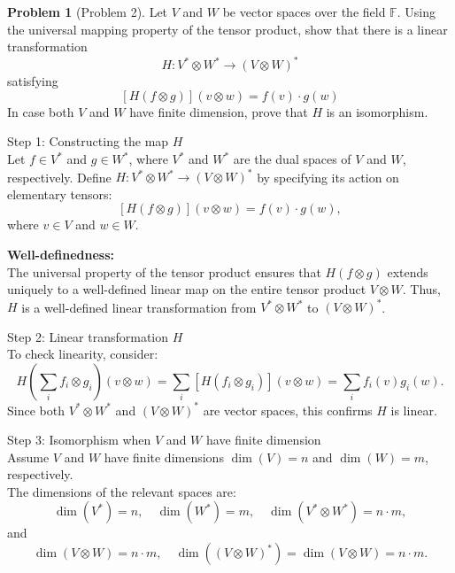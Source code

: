 \documentclass[12pt]{article}
\theoremstyle{definition}
\newtheorem{problem}{Problem}
\begin{document}
\begin{problem}[Problem 2]
    Let $V$ and $W$ be vector spaces over the field $\mathbb{F}$. Using the universal
    mapping property of the tensor product, show that there is a linear transformation
    \[
        H: V^* \otimes W^* \longrightarrow (V \otimes W)^*
    \]
    satisfying
    \[
        [H(f \otimes g)](v \otimes w) = f(v) \cdot g(w)
    \]
    In case both $V$ and $W$ have finite dimension, prove that $H$ is an isomorphism.
    
    \begin{solution}
        Step 1: Constructing the map \( H \)\\
        Let \( f \in V^* \) and \( g \in W^* \), where \( V^* \) and \( W^* \) are the dual spaces of \( V \) and \( W \), respectively. Define \( H: V^* \otimes W^* \to (V \otimes W)^* \) by specifying its action on elementary tensors:
        \[
        [H(f \otimes g)](v \otimes w) = f(v) \cdot g(w),
        \]
        where \( v \in V \) and \( w \in W \).

        \textbf{Well-definedness:}\\
        The universal property of the tensor product ensures that \( H(f \otimes g) \) extends uniquely to a well-defined linear map on the entire tensor product \( V \otimes W \). Thus, \( H \) is a well-defined linear transformation from \( V^* \otimes W^* \) to \( (V \otimes W)^* \).

        Step 2: Linear transformation \( H \)\\
        To check linearity, consider:\\
        \[
        H\left(\sum_i f_i \otimes g_i\right)(v \otimes w) = \sum_i [H(f_i \otimes g_i)](v \otimes w) = \sum_i f_i(v) g_i(w).
        \]
        Since both \( V^* \otimes W^* \) and \( (V \otimes W)^* \) are vector spaces, this confirms \( H \) is linear.

        Step 3: Isomorphism when \( V \) and \( W \) have finite dimension\\
        Assume \( V \) and \( W \) have finite dimensions \( \dim(V) = n \) and \( \dim(W) = m \), respectively.\\ The dimensions of the relevant spaces are:
        \[
        \dim(V^*) = n, \quad \dim(W^*) = m, \quad \dim(V^* \otimes W^*) = n \cdot m,
        \]
        and
        \[
        \dim(V \otimes W) = n \cdot m, \quad \dim((V \otimes W)^*) = \dim(V \otimes W) = n \cdot m.
        \]


\end{solution}
\end{problem}
\end{document}
